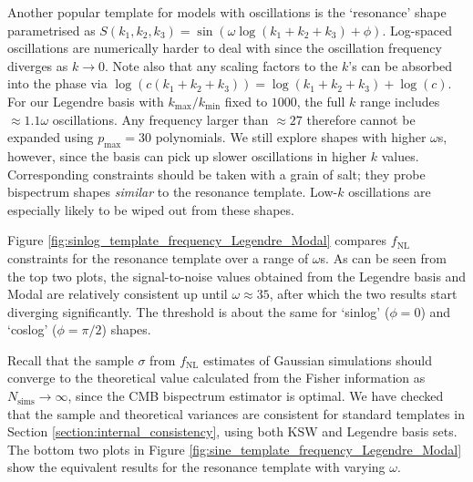 Another popular template for models with oscillations is the `resonance' shape parametrised as $S(k_1, k_2, k_3) = \sin(\omega \log(k_1 + k_2 + k_3 ) + \phi)$. Log-spaced oscillations are numerically harder to deal with since the oscillation frequency diverges as $k \rightarrow 0$. Note also that any scaling factors to the $k$'s can be absorbed into the phase via $\log(c(k_1 + k_2 + k_3)) = \log(k_1 + k_2 + k_3) + \log(c)$. For our Legendre basis with $k_\text{max}/k_\text{min}$ fixed to $1000$, the full $k$ range includes $\approx 1.1\omega$ oscillations. Any frequency larger than $\approx 27$ therefore cannot be expanded using $p_\text{max}=30$ polynomials. We still explore shapes with higher $\omega$s, however, since the basis can pick up slower oscillations in higher $k$ values. Corresponding constraints should be taken with a grain of salt; they probe bispectrum shapes \textit{similar} to the resonance template. Low-$k$ oscillations are especially likely to be wiped out from these shapes.

Figure \ref{fig:sinlog_template_frequency_Legendre_Modal} compares $f_\text{NL}$ constraints for the resonance template over a range of $\omega$s. As can be seen from the top two plots, the signal-to-noise values obtained from the Legendre basis and Modal are relatively consistent up until $\omega \approx 35$, after which the two results start diverging significantly. The threshold is about the same for `sinlog' ($\phi = 0$) and `coslog' ($\phi=\pi/2$) shapes.

Recall that the sample $\sigma$ from $f_\text{NL}$ estimates of Gaussian simulations should converge to the theoretical value calculated from the Fisher information as $N_\text{sims}\rightarrow\infty$, since the CMB bispectrum estimator is optimal. We have checked that the sample and theoretical variances are consistent for standard templates in Section \ref{section:internal_consistency}, using both KSW and Legendre basis sets. The bottom two plots in Figure \ref{fig:sine_template_frequency_Legendre_Modal} show the equivalent results for the resonance template with varying $\omega$.

